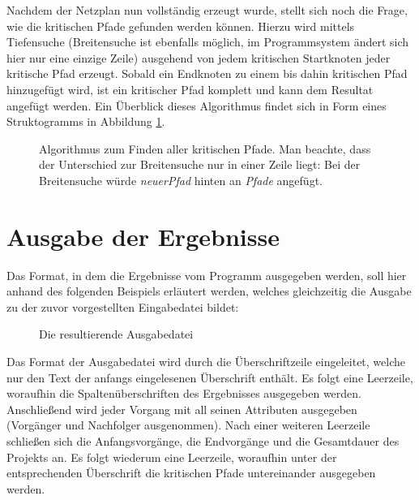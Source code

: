 Nachdem der Netzplan nun vollst\"andig erzeugt wurde, stellt sich noch
die Frage, wie die kritischen Pfade gefunden werden k\"onnen. Hierzu
wird mittels Tiefensuche (Breitensuche ist ebenfalls m\"oglich, im
Programmsystem \"andert sich hier nur eine einzige Zeile) ausgehend
von jedem kritischen Startknoten
jeder kritische Pfad erzeugt. Sobald ein Endknoten zu einem bis dahin
kritischen Pfad hinzugef\"ugt wird, ist ein kritischer Pfad
komplett und kann dem Resultat angef\"ugt werden. Ein \"Uberblick
dieses Algorithmus findet sich in Form eines Struktogramms in
Abbildung \ref{pfadefinden}.

\begin{figure}[h]
  
  \caption{Algorithmus zum Finden aller kritischen Pfade. Man beachte,
  dass der Unterschied zur Breitensuche nur in einer Zeile liegt: Bei
  der Breitensuche w\"urde \textit{neuerPfad} hinten an \textit{Pfade}
  angef\"ugt.}
  \label{pfadefinden}
\end{figure}

\section{Ausgabe der Ergebnisse}

Das Format, in dem die Ergebnisse vom Programm ausgegeben werden, soll
hier anhand des folgenden Beispiels erl\"autert werden, welches
gleichzeitig die Ausgabe zu der zuvor vorgestellten Eingabedatei bildet:

\begin{figure}[h!]
  \resizebox{\textwidth}{!}{
    \fbox{
      \setlength{\fboxrule}{1pt}
      
    }
  }
  \caption{Die resultierende Ausgabedatei}
\end{figure}

Das Format der Ausgabedatei wird durch die \"Uberschriftzeile
eingeleitet, welche nur den Text der anfangs eingelesenen
\"Uberschrift enth\"alt. Es folgt eine Leerzeile, woraufhin die
Spalten\"uberschriften des Ergebnisses ausgegeben
werden. Anschlie{\ss}end wird jeder Vorgang mit all seinen
Attributen ausgegeben (Vorg\"anger und Nachfolger ausgenommen).
Nach einer weiteren Leerzeile schlie{\ss}en sich die
Anfangsvorg\"ange, die Endvorg\"ange und die Gesamtdauer des Projekts
an. Es folgt wiederum eine
Leerzeile, woraufhin unter der entsprechenden \"Uberschrift die
kritischen Pfade untereinander ausgegeben werden.
